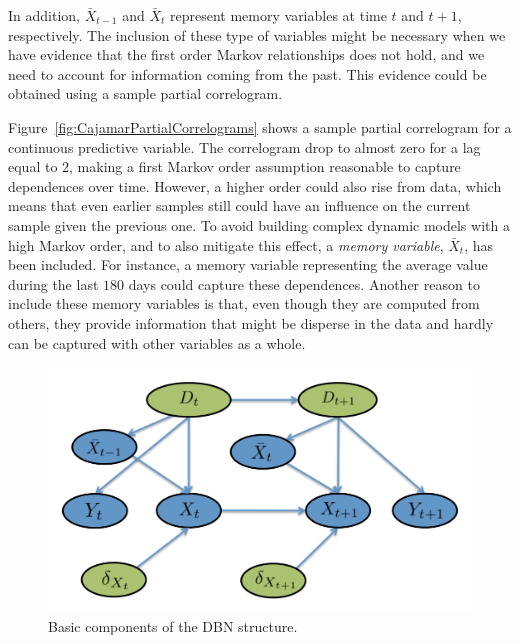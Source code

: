 In addition, $\bar{X}_{t-1}$ and $\bar{X}_{t}$ represent memory variables at time $t$ and $t+1$, respectively. The inclusion of these type of variables might be necessary when we have evidence that the first order Markov relationships does not hold, and we need to account for information coming from the past. This evidence could be obtained using a sample partial correlogram.

Figure~\ref{fig:CajamarPartialCorrelograms} shows a sample partial correlogram for a continuous predictive variable. The correlogram drop to almost zero for a lag equal to $2$, making a first Markov order assumption reasonable to capture dependences over time. However, a higher order could also rise from data, which means that even earlier samples still could have an influence on the current sample given the previous one. 
To avoid building complex dynamic models with a high Markov order, and to also mitigate this effect, a \emph{memory variable}, $\bar{X}_t$, has been included. For instance, a memory variable representing the average value during the last $180$ days could capture these dependences. Another reason to include these memory variables is that, even though they are computed from others, they provide information that might be disperse in the data and hardly can be captured with other variables as a whole. 

\begin{figure}[htbp]
\begin{center}
\includegraphics[scale=0.45]{./figures/CajaMarModel2}
\caption{Basic components of the DBN structure.}
\label{fig:component}
\end{center}
\end{figure}


